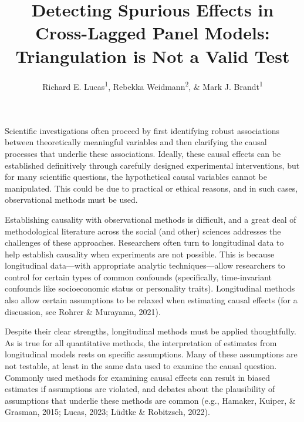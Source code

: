 \documentclass[
  man,floatsintext]{apa6}
\title{Detecting Spurious Effects in Cross-Lagged Panel Models: Triangulation is Not a Valid Test}
\author{Richard E. Lucas\textsuperscript{1}, Rebekka Weidmann\textsuperscript{2}, \& Mark J. Brandt\textsuperscript{1}}
\date{}
\affiliation{\vspace{0.5cm}\textsuperscript{1} Department of Psychology, Michigan State University\\\textsuperscript{2} Department of Psychology, Brigham Young University}
\begin{document}
\maketitle

Scientific investigations often proceed by first identifying robust associations between theoretically meaningful variables and then clarifying the causal processes that underlie these associations. Ideally, these causal effects can be established definitively through carefully designed experimental interventions, but for many scientific questions, the hypothetical causal variables cannot be manipulated. This could be due to practical or ethical reasons, and in such cases, observational methods must be used.

Establishing causality with observational methods is difficult, and a great deal of methodological literature across the social (and other) sciences addresses the challenges of these approaches. Researchers often turn to longitudinal data to help establish causality when experiments are not possible. This is because longitudinal data---with appropriate analytic techniques---allow researchers to control for certain types of common confounds (specifically, time-invariant confounds like socioeconomic status or personality traits). Longitudinal methods also allow certain assumptions to be relaxed when estimating causal effects (for a discussion, see Rohrer \& Murayama, 2021).

Despite their clear strengths, longitudinal methods must be applied thoughtfully. As is true for all quantitative methods, the interpretation of estimates from longitudinal models rests on specific assumptions. Many of these assumptions are not testable, at least in the same data used to examine the causal question. Commonly used methods for examining causal effects can result in biased estimates if assumptions are violated, and debates about the plausibility of assumptions that underlie these methods are common (e.g., Hamaker, Kuiper, \& Grasman, 2015; Lucas, 2023; Lüdtke \& Robitzsch, 2022).
\end{document}
